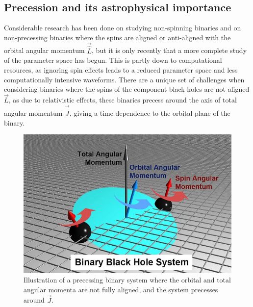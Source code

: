 \documentclass[11pt]{article}
\begin{document}
\subsection{Precession and its astrophysical importance}
Considerable research has been done on studying non-spinning binaries and on non-precessing binaries where the spins are aligned or anti-aligned with the orbital angular momentum $\vec{\hat{L}}$\cite{pe3}, but it is only recently that a more complete study of the parameter space has begun\cite{sloos}\cite{pe_latest}. This is partly down to computational resources, as ignoring spin effects leads to a reduced parameter space and less computationally intensive waveforms. There are a unique set of challenges when considering binaries where the spins of the component black holes are not aligned $\vec{L}$, as due to relativistic effects, these binaries precess around the axis of total angular momentum $\vec{\hat{J}}$, giving a time dependence to the orbital plane of the binary\cite{precess1}\cite{precess2}.
\begin{figure}[H]
	\includegraphics[scale=0.75]{fig6.jpg}
	\centering
	\caption{\cite{precBH}Illustration of a precessing binary system where the orbital and total angular momenta are not fully aligned, and the system precesses around $\vec{J}$.}
	\centering
\end{figure}
\end{document}
